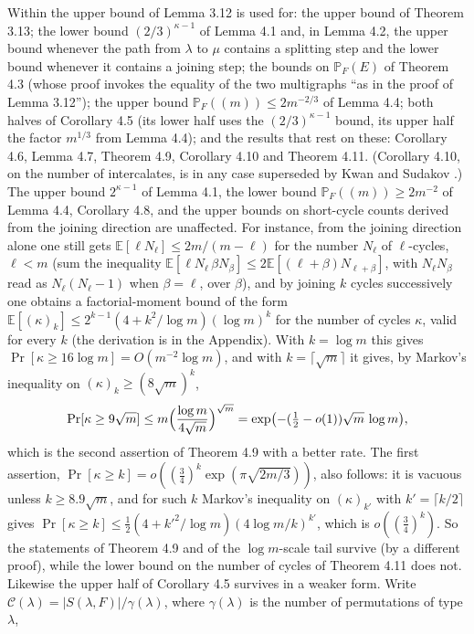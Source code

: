 \documentclass[11pt]{article}
\theoremstyle{remark}
\newcommand{\PP}{\mathbb P}
\newcommand{\CC}{\mathcal C}
\newcommand{\E}{\mathbb E}
\begin{document}
Within \cite{CGW08} the upper bound of Lemma 3.12 is used for: the
upper bound of Theorem 3.13; the lower bound $(2/3)^{\kappa-1}$ of
Lemma 4.1 and, in Lemma 4.2, the upper bound whenever the path from
$\lambda$ to $\mu$ contains a splitting step and the lower bound
whenever it contains a joining step; the bounds on $\PP_F(E)$ of
Theorem 4.3 (whose proof invokes the equality of the two multigraphs
``as in the proof of Lemma 3.12''); the upper bound
$\PP_F((m))\le2m^{-2/3}$ of Lemma 4.4; both halves of Corollary 4.5
(its lower half uses the $(2/3)^{\kappa-1}$ bound, its upper half the
factor $m^{1/3}$ from Lemma 4.4); and the results that rest on these:
Corollary 4.6, Lemma 4.7, Theorem 4.9, Corollary 4.10 and Theorem
4.11.  (Corollary 4.10, on the number of intercalates, is in any case
superseded by Kwan and Sudakov \cite{KS18}.)  The upper bound
$2^{\kappa-1}$ of Lemma 4.1, the lower bound $\PP_F((m))\ge2m^{-2}$ of
Lemma 4.4, Corollary 4.8, and the upper bounds on short-cycle counts
derived from the joining direction are unaffected.  For instance, from
the joining direction alone one still gets $\E[\ell N_\ell]\le2m/(m-\ell)$
for the number $N_\ell$ of $\ell$-cycles, $\ell<m$ (sum the
inequality $\E[\ell N_\ell\,\beta N_\beta]\le2\E[(\ell+\beta)N_{\ell+\beta}]$,
with $N_\ell N_\beta$ read as $N_\ell(N_\ell-1)$ when $\beta=\ell$, over
$\beta$), and by joining $k$ cycles successively one obtains a
factorial-moment bound of the form
$\E[(\kappa)_k]\le2^{k-1}(4+k^2/\log m)(\log m)^k$ for the number of
cycles $\kappa$, valid for every $k$ (the derivation is in the
Appendix).  With $k=\log m$ this gives $\Pr[\kappa\ge16\log m]=O(m^{-2}\log m)$,
and with $k=\lceil\sqrt m\rceil$ it gives, by Markov's inequality on $(\kappa)_k\ge(8\sqrt m)^k$,
\[
\Pr[\kappa\ge9\sqrt m]\le m\Bigl(\frac{\log m}{4\sqrt m}\Bigr)^{\sqrt m}
=\exp\bigl(-(\tfrac12-o(1))\sqrt m\,\log m\bigr),
\]
which is the second assertion of Theorem 4.9 with a better rate.  The
first assertion, $\Pr[\kappa\ge k]=o((\tfrac34)^k\exp(\pi\sqrt{2m/3}))$,
also follows: it is vacuous unless $k\ge8.9\sqrt m$, and for such $k$
Markov's inequality on $(\kappa)_{k'}$ with $k'=\lceil k/2\rceil$ gives
$\Pr[\kappa\ge k]\le\tfrac12(4+k'^2/\log m)(4\log m/k)^{k'}$, which is
$o((\tfrac34)^k)$.  So the statements of Theorem 4.9 and of the
$\log m$-scale tail survive (by a different proof), while the lower bound on the number of cycles of
Theorem 4.11 does not.  Likewise the upper half of Corollary 4.5
survives in a weaker form.  Write $\CC(\lambda)=|S(\lambda,F)|/\gamma(\lambda)$,
where $\gamma(\lambda)$ is the number of permutations of type $\lambda$,
\end{document}
